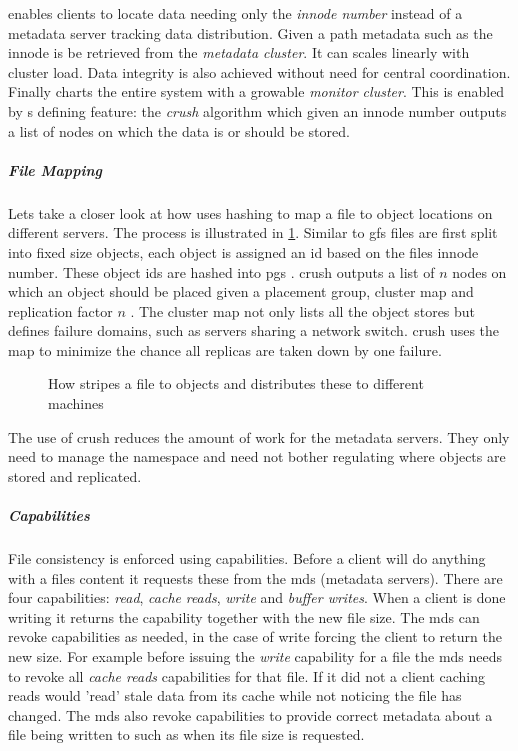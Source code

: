 enables clients to locate data needing only the \textit{innode number} instead of a metadata server tracking data distribution. Given a path metadata such as the innode is be retrieved from the \textit{metadata cluster}. It can scales linearly with cluster load. Data integrity is also achieved without need for central coordination. Finally  charts the entire system with a growable \textit{monitor cluster}. This is enabled by s defining feature: the \emph{\ac{crush}} algorithm which given an innode number outputs a list of nodes on which the data is or should be stored.

\subparagraph{File Mapping}
Lets take a closer look at how  uses hashing to map a file to object locations on different servers. The process is illustrated in \cref{fig:ceph_crush}. Similar to \ac{gfs} files are first split into fixed size objects, each object is assigned an id based on the files innode number. These object ids are hashed into \acp{pg} . \ac{crush} outputs a list of $n$ nodes on which an object should be placed given a placement group, cluster map and replication factor $n$ . The cluster map not only lists all the object stores but defines failure domains, such as servers sharing a network switch. \ac{crush} uses the map to minimize the chance all replicas are taken down by one failure.

\begin{figure}[htbp]
	\centering
	
	\caption{How  stripes a file to objects and distributes these to different machines}
	\label{fig:ceph_crush}
\end{figure}

The use of \ac{crush} reduces the amount of work for the metadata servers. They only need to manage the namespace and need not bother regulating where objects are stored and replicated.

\subparagraph{Capabilities}
File consistency is enforced using capabilities. Before a client will do anything with a files content it requests these from the \ac{mds} (metadata servers). There are four capabilities: \textit{read}, \textit{cache} \textit{reads}, \textit{write} and \textit{buffer writes}. When a client is done writing it returns the capability together with the new file size. The \ac{mds} can revoke capabilities as needed, in the case of write forcing the client to return the new size. For example before issuing the \textit{write} capability for a file the \ac{mds} needs to revoke all \textit{cache reads} capabilities for that file. If it did not a client caching reads would 'read' stale data from its cache while not noticing the file has changed. The \ac{mds} also revoke capabilities to provide correct metadata about a file being written to such as when its file size is requested.

